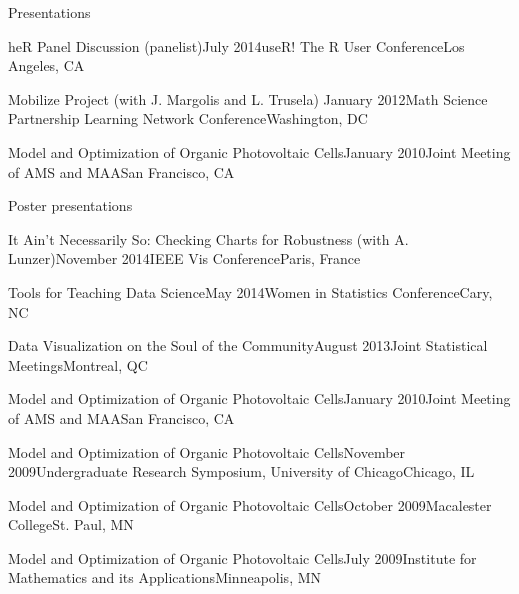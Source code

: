 \documentclass{resume} %
\begin{document}
\begin{rSection}{Presentations}
\begin{sSubsection}{heR Panel Discussion}{ (panelist)}{July 2014}{useR! The R User Conference}{Los Angeles, CA}
\end{sSubsection}

\begin{sSubsection}{Mobilize Project}{ (with J. Margolis and L. Trusela)} {January 2012}{Math Science Partnership Learning Network Conference}{Washington, DC}
\end{sSubsection}

\begin{sSubsection}{Model and Optimization of Organic Photovoltaic Cells}{}{January 2010}{Joint Meeting of AMS and MAA}{San Francisco, CA}
\end{sSubsection}
\end{rSection}

\begin{rSection}{Poster presentations}

\begin{sSubsection}{It Ain't Necessarily So: Checking Charts for Robustness}{ (with A. Lunzer)}{November 2014}{IEEE Vis Conference}{Paris, France}
\end{sSubsection}

\begin{sSubsection}{Tools for Teaching Data Science}{}{May 2014}{Women in Statistics Conference}{Cary, NC}
\end{sSubsection}

\begin{sSubsection}{Data Visualization on the Soul of the Community}{}{August 2013}{Joint Statistical Meetings}{Montreal, QC}
\end{sSubsection}

\begin{sSubsection}{Model and Optimization of Organic Photovoltaic Cells}{}{January 2010}{Joint Meeting of AMS and MAA}{San Francisco, CA}
\end{sSubsection}

\begin{sSubsection}{Model and Optimization of Organic Photovoltaic Cells}{}{November 2009}{Undergraduate Research Symposium, University of Chicago}{Chicago, IL}
\end{sSubsection}

\begin{sSubsection}{Model and Optimization of Organic Photovoltaic Cells}{}{October 2009}{Macalester College}{St. Paul, MN}
\end{sSubsection}

\begin{sSubsection}{Model and Optimization of Organic Photovoltaic Cells}{}{July 2009}{Institute for Mathematics and its Applications}{Minneapolis, MN}
\end{sSubsection}
\end{rSection}
\end{document}
